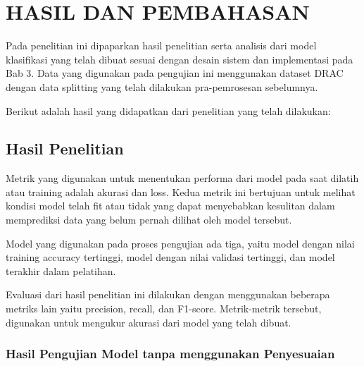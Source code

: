 \chapter{HASIL DAN PEMBAHASAN}
\label{chap:4}

Pada penelitian ini dipaparkan hasil penelitian serta analisis dari model klasifikasi yang telah dibuat sesuai dengan desain sistem dan implementasi pada Bab 3. Data yang digunakan pada pengujian ini menggunakan dataset DRAC dengan data splitting yang telah dilakukan pra-pemrosesan sebelumnya.

Berikut adalah hasil yang didapatkan dari penelitian yang telah dilakukan:

\section{Hasil Penelitian}
\label{sec:41}

Metrik yang digunakan untuk menentukan performa dari model pada saat dilatih atau training adalah akurasi dan loss. Kedua metrik ini bertujuan untuk melihat kondisi model telah fit atau tidak yang dapat menyebabkan kesulitan dalam memprediksi data yang belum pernah dilihat oleh model tersebut.

Model yang digunakan pada proses pengujian ada tiga, yaitu model dengan nilai training accuracy tertinggi, model dengan nilai validasi tertinggi, dan model terakhir dalam pelatihan.

Evaluasi dari hasil penelitian ini dilakukan dengan menggunakan beberapa metriks lain yaitu precision, recall, dan F1-score. Metrik-metrik tersebut, digunakan untuk mengukur akurasi dari model yang telah dibuat.

\subsection{Hasil Pengujian Model tanpa menggunakan Penyesuaian}
\label{sec:411}

